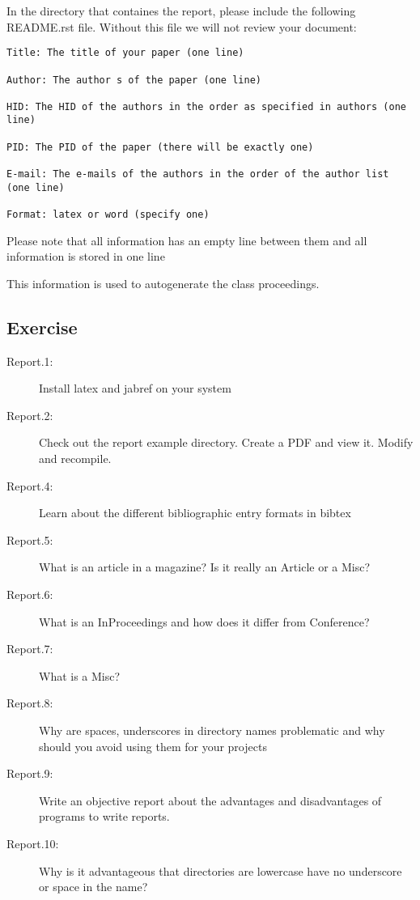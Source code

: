 In the directory that containes the report, please include the following
README.rst file. Without this file we will not review your document:

\begin{verbatim}
Title: The title of your paper (one line)

Author: The author s of the paper (one line)

HID: The HID of the authors in the order as specified in authors (one line)

PID: The PID of the paper (there will be exactly one)

E-mail: The e-mails of the authors in the order of the author list (one line)

Format: latex or word (specify one)
\end{verbatim}

Please note that all information has an empty line between them and all
information is stored in one line

This information is used to autogenerate the class proceedings.

\subsection{Exercise}\label{exercise}

\begin{description}
\item[Report.1:]
Install latex and jabref on your system
\item[Report.2:]
Check out the report example directory. Create a PDF and view it. Modify
and recompile.
\item[Report.4:]
Learn about the different bibliographic entry formats in bibtex
\item[Report.5:]
What is an article in a magazine? Is it really an Article or a Misc?
\item[Report.6:]
What is an InProceedings and how does it differ from Conference?
\item[Report.7:]
What is a Misc?
\item[Report.8:]
Why are spaces, underscores in directory names problematic and why
should you avoid using them for your projects
\item[Report.9:]
Write an objective report about the advantages and disadvantages of
programs to write reports.
\item[Report.10:]
Why is it advantageous that directories are lowercase have no underscore
or space in the name?
\end{description}

